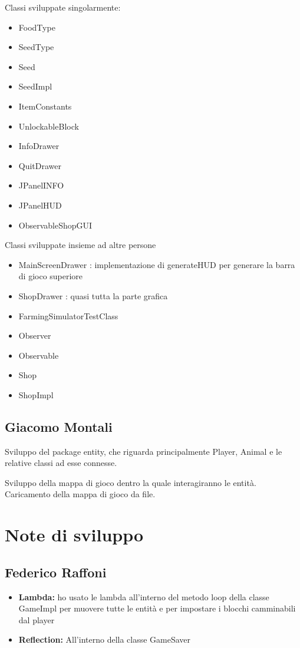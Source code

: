 \documentclass[a4paper,12pt]{report}
\begin{document}
\hfill\break
Classi sviluppate singolarmente:
{
\begin{itemize}
	\item FoodType
	\item SeedType
	\item Seed
	\item SeedImpl
	\item ItemConstants
	\item UnlockableBlock
	\item InfoDrawer
	\item QuitDrawer
	\item JPanelINFO
	\item JPanelHUD
	\item ObservableShopGUI
\end{itemize}
}
\hfill\break

Classi sviluppate insieme ad altre persone
{
\begin{itemize}
	\item MainScreenDrawer : implementazione di generateHUD per generare la barra di gioco superiore
	\item ShopDrawer : quasi tutta la parte grafica
	\item FarmingSimulatorTestClass 
	\item Observer
	\item Observable
	\item Shop
	\item ShopImpl
\end{itemize}
}

\subsection{Giacomo Montali}
Sviluppo del package entity, che riguarda principalmente Player, Animal e le relative classi ad esse connesse.

Sviluppo della mappa di gioco dentro la quale interagiranno le entità. Caricamento della mappa di gioco da file.

\section{Note di sviluppo}

\subsection{Federico Raffoni}

\begin{itemize}
	\item \textbf{Lambda:} ho usato le lambda all’interno del metodo loop della classe GameImpl per muovere tutte le entità e per impostare i blocchi camminabili dal player
	\item\textbf{Reflection:} All’interno della classe GameSaver
\end{itemize}
\end{document}
